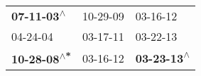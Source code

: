 \begin{supertabular}{lll}
  \textbf{07-11-03\textsuperscript{$\wedge$}} &  10-29-09\textsuperscript{} &                   03-16-12\textsuperscript{} \\
                   04-24-04\textsuperscript{} &  03-17-11\textsuperscript{} &                   03-22-13\textsuperscript{} \\
 \textbf{10-28-08\textsuperscript{$\wedge$*}} &  03-16-12\textsuperscript{} &  \textbf{03-23-13\textsuperscript{$\wedge$}} \\
\end{supertabular}

